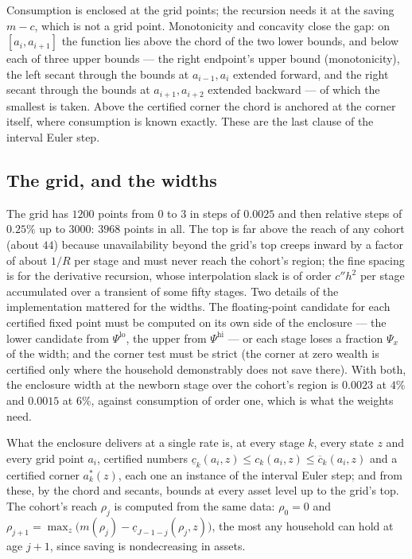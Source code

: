 \documentclass[11pt]{article}
\theoremstyle{definition}
\theoremstyle{remark}
\begin{document}
Consumption is enclosed at the grid points; the recursion needs it at the saving $m-c$, which is not
a grid point. Monotonicity and concavity close the gap: on $[a_i,a_{i+1}]$ the function lies above
the chord of the two lower bounds, and below each of three upper bounds --- the right endpoint's
upper bound (monotonicity), the left secant through the bounds at $a_{i-1},a_i$ extended forward, and
the right secant through the bounds at $a_{i+1},a_{i+2}$ extended backward --- of which the smallest
is taken. Above the certified corner the chord is anchored at the corner itself, where consumption
is known exactly. These are the last clause of the interval Euler step.

\subsection{The grid, and the widths}

The grid has $1200$ points from $0$ to $3$ in steps of $0.0025$ and then relative steps of
$0.25\%$ up to $3000$: $3968$ points in all. The top is far above the reach of any cohort (about
$44$) because unavailability beyond the grid's top creeps inward by a factor of about $1/R$ per
stage and must never reach the cohort's region; the fine spacing is for the derivative recursion,
whose interpolation slack is of order $c''h^2$ per stage accumulated over a transient of some fifty
stages. Two details of the implementation mattered for the widths. The floating-point candidate for
each certified fixed point must be computed on its own side of the enclosure --- the lower
candidate from $\Psi^{\mathrm{lo}}$, the upper from $\Psi^{\mathrm{hi}}$ --- or each stage loses a
fraction $\Psi_x$ of the width; and the corner test must be strict (the corner at zero wealth is
certified only where the household demonstrably does not save there). With both, the enclosure
width at the newborn stage over the cohort's region is $0.0023$ at $4\%$ and $0.0015$ at $6\%$,
against consumption of order one, which is what the weights need.

What the enclosure delivers at a single rate is, at every stage $k$, every state $z$ and every
grid point $a_i$, certified numbers $\underline c_k(a_i,z)\le c_k(a_i,z)\le\overline c_k(a_i,z)$ and
a certified corner $a^*_k(z)$, each one an instance of the interval Euler step; and from these, by
the chord and secants, bounds at every asset level up to the grid's top. The cohort's reach
$\rho_j$ is computed from the same data: $\rho_0=0$ and $\rho_{j+1}=\max_z\bigl(m(\rho_j)-
\underline c_{J-1-j}(\rho_j,z)\bigr)$, the most any household can hold at age $j+1$, since saving is
nondecreasing in assets.
\end{document}
